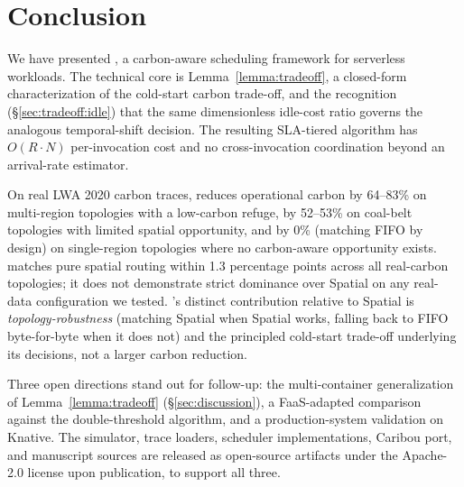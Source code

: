 \section{Conclusion}
\label{sec:conclusion}

We have presented \GreenFaaS, a carbon-aware scheduling framework for
serverless workloads. The technical core is
Lemma~\ref{lemma:tradeoff}, a closed-form characterization of the
cold-start carbon trade-off, and the recognition
(\S\ref{sec:tradeoff:idle}) that the same dimensionless idle-cost
ratio governs the analogous temporal-shift decision. The resulting
SLA-tiered algorithm has $O(R \cdot N)$ per-invocation cost and no
cross-invocation coordination beyond an arrival-rate estimator.

On real LWA 2020 carbon traces, \GreenFaaS{} reduces operational
carbon by 64--83\% on multi-region topologies with a low-carbon
refuge, by 52--53\% on coal-belt topologies with limited spatial
opportunity, and by 0\% (matching FIFO by design) on single-region
topologies where no carbon-aware opportunity exists.
\GreenFaaS{} matches pure spatial routing within 1.3
percentage points across all real-carbon topologies; it does not
demonstrate strict dominance over Spatial on any real-data
configuration we tested. \GreenFaaS's distinct contribution relative
to Spatial is \emph{topology-robustness} (matching Spatial when
Spatial works, falling back to FIFO byte-for-byte when it does not)
and the principled cold-start trade-off underlying its decisions,
not a larger carbon reduction.

Three open directions stand out for follow-up: the multi-container
generalization of Lemma~\ref{lemma:tradeoff} (\S\ref{sec:discussion}),
a FaaS-adapted comparison against the
\citet{lechowicz2024online} double-threshold algorithm, and a
production-system validation on Knative. The simulator, trace
loaders, scheduler implementations, Caribou port, and manuscript
sources are released as open-source artifacts under the Apache-2.0
license upon publication, to support all three.

